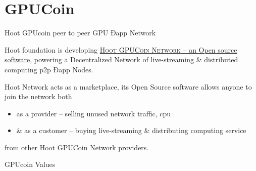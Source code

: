 \documentclass[10pt]{beamer}
\begin{document}
\section{GPUCoin}
\begin{frame}[fragile]{Hoot GPUcoin peer to peer GPU Ðapp Network }

 Hoot foundation is developing \href{https://onhoot.com/tokensale}{\textsc{Hoot GPUCoin Network} – an Open source software}, powering a Decentralized Network of live-streaming \& distributed computing p2p Ðapp Nodes.
 

Hoot Network acts as a marketplace, its Open Source software allows anyone to join the network both 

\begin{itemize}
\item as a provider – selling unused network traffic, cpu
\item \& as a customer – buying live-streaming \& distributing computing service
\end{itemize}
 from other Hoot GPUCoin Network providers. 
\end{frame}

\begin{frame}[t]{GPUcoin Values}


\end{frame}
\end{document}
